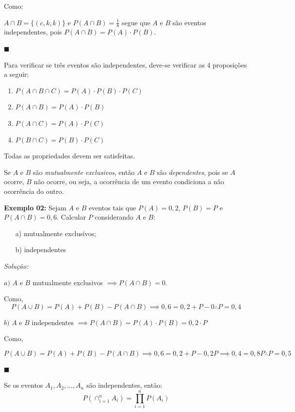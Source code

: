 \documentclass[oneside,a4paper,12pt]{article}
\begin{document}
Como:

$A \cap B = \{ (c,k,k)\}$ e $P(A \cap B) = \displaystyle \frac{1}{8}$ segue que $A$ e $B$ são eventos independentes, pois $P(A \cap B) =P(A)\cdot P(B)$.

\begin{flushright}
	$\blacksquare$
\end{flushright}

Para verificar se três eventos são independentes, deve-se verificar as $4$ proposições a seguir:

\begin{enumerate}
	\item $P(A \cap B \cap C) = P(A) \cdot P(B) \cdot P(C)$
	\item $P(A \cap B) = P(A) \cdot P(B)$
	\item $P(A \cap C) = P(A) \cdot P(C)$
	\item $P(B \cap C) = P(B) \cdot P(C)$
\end{enumerate}

Todas as propriedades devem ser satisfeitas.

Se $A$ e $B$ são {\it mutualmente exclusivos}, então $A$ e $B$ são {\it dependentes}, pois se $A$ ocorre, $B$ não ocorre, ou seja, a ocorrência de um evento condiciona a não ocorrência do outro.

{\bf Exemplo 02:} Sejam $A$ e $B$ eventos tais que $P(A) = 0,2$, $P(B) = P$ e $P(A \cap B) = 0,6$. Calcular $P$ considerando $A$ e $B$:
\begin{itemize}
	\item[a)] mutualmente exclusivos;
	\item[b)] independentes
\end{itemize}

{\it Solução:}

$a)$ $A$ e $B$ mutualmente exclusivos $\implies P(A \cap B) = 0$.

Como,
$$P(A \cup B) = P(A) + P(B) - P(A \cap B) \implies 0,6 = 0,2 + P - 0 \therefore P=0,4$$

$b)$ $A$ e $B$ independentes $\implies P(A \cap B) = P(A) \cdot P(B) = 0,2 \cdot P$

Como,

$$P(A \cup B) = P(A) + P(B) - P(A \cap B) \implies 0,6 = 0,2 + P - 0,2P \implies 0,4 = 0,8P \therefore P = 0,5$$

\begin{flushright}
	$\blacksquare$
\end{flushright}


Se os eventos $A_1,A_2,\dots,A_n$ são independentes, então:
$$P\left( \displaystyle \cap_{i=1}^{n} A_i \right) = \prod_{i=1}^{n} P(A_i)$$
\end{document}

